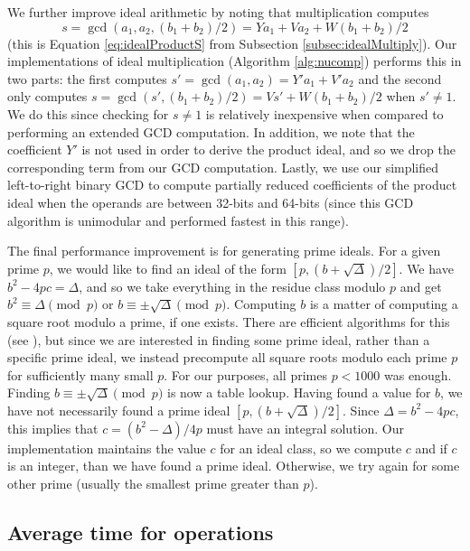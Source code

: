 \documentclass{ucalgthes1}
\theoremstyle{definition}
\begin{document}
We further improve ideal arithmetic by noting that multiplication computes
\[
s = \gcd(a_1, a_2, (b_1+b_2)/2) = Ya_1 + Va_2 + W(b_1+b_2)/2
\]
(this is Equation \ref{eq:idealProductS} from Subsection \ref{subsec:idealMultiply}).  Our implementations of ideal multiplication (Algorithm \ref{alg:nucomp}) performs this in two parts: the first computes $s' = \gcd(a_1, a_2) = Y'a_1 + V'a_2$ and the second only computes $s = \gcd(s', (b_1 + b_2)/2) = Vs' + W(b_1 + b_2)/2$ when $s' \neq 1$.  We do this since checking for $s \neq 1$ is relatively inexpensive when compared to performing an extended GCD computation.  In addition, we note that the coefficient $Y'$ is not used in order to derive the product ideal, and so we drop the corresponding term from our GCD computation. Lastly, we use our simplified left-to-right binary GCD to compute partially reduced coefficients of the product ideal when the operands are between 32-bits and 64-bits (since this GCD algorithm is unimodular and performed fastest in this range).

The final performance improvement is for generating prime ideals.  For a given prime $p$, we would like to find an ideal of the form $[p, (b + \sqrt\Delta)/2]$.  We have $b^2 - 4pc = \Delta$, and so we take everything in the residue class modulo $p$ and get $b^2 \equiv \Delta \pmod p$ or $b \equiv \pm\sqrt\Delta \pmod p$.  Computing $b$ is a matter of computing a square root modulo a prime, if one exists.  There are efficient algorithms for this (see \cite{Bach1996}), but since we are interested in finding some prime ideal, rather than a specific prime ideal, we instead precompute all square roots modulo each prime $p$ for sufficiently many small $p$.  For our purposes, all primes $p < 1000$ was enough.  Finding $b \equiv \pm\sqrt\Delta \pmod p$ is now a table lookup. Having found a value for $b$, we have not necessarily found a prime ideal $[p, (b + \sqrt\Delta)/2]$.  Since $\Delta = b^2 - 4pc$, this implies that $c = (b^2 - \Delta)/4p$ must have an integral solution.  Our implementation maintains the value $c$ for an ideal class, so we compute $c$ and if $c$ is an integer, than we have found a prime ideal.  Otherwise, we try again for some other prime (usually the smallest prime greater than $p$).


\subsection{Average time for operations}
\end{document}
